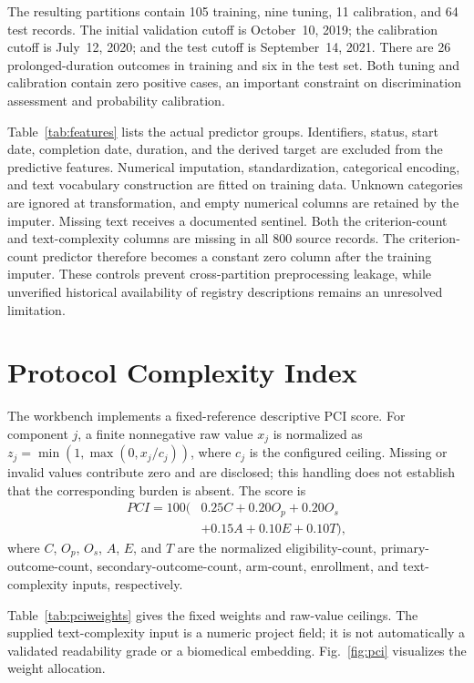 \documentclass[10pt,letterpaper,twocolumn]{article}
\begin{document}
The resulting partitions contain 105 training, nine tuning, 11 calibration, and 64 test records. The initial validation cutoff is October~10, 2019; the calibration cutoff is July~12, 2020; and the test cutoff is September~14, 2021. There are 26 prolonged-duration outcomes in training and six in the test set. Both tuning and calibration contain zero positive cases, an important constraint on discrimination assessment and probability calibration.

Table~\ref{tab:features} lists the actual predictor groups. Identifiers, status, start date, completion date, duration, and the derived target are excluded from the predictive features. Numerical imputation, standardization, categorical encoding, and text vocabulary construction are fitted on training data. Unknown categories are ignored at transformation, and empty numerical columns are retained by the imputer. Missing text receives a documented sentinel. Both the criterion-count and text-complexity columns are missing in all 800 source records. The criterion-count predictor therefore becomes a constant zero column after the training imputer. These controls prevent cross-partition preprocessing leakage, while unverified historical availability of registry descriptions remains an unresolved limitation.

\section{Protocol Complexity Index}

The workbench implements a fixed-reference descriptive PCI score. For component $j$, a finite nonnegative raw value $x_j$ is normalized as $z_j=\min(1,\max(0,x_j/c_j))$, where $c_j$ is the configured ceiling. Missing or invalid values contribute zero and are disclosed; this handling does not establish that the corresponding burden is absent. The score is
\begin{equation}
\begin{split}
PCI=100(&0.25C+0.20O_p+0.20O_s\\
       &+0.15A+0.10E+0.10T),
\end{split}
\label{eq:pci}
\end{equation}
where $C$, $O_p$, $O_s$, $A$, $E$, and $T$ are the normalized eligibility-count, primary-outcome-count, secondary-outcome-count, arm-count, enrollment, and text-complexity inputs, respectively.

Table~\ref{tab:pciweights} gives the fixed weights and raw-value ceilings. The supplied text-complexity input is a numeric project field; it is not automatically a validated readability grade or a biomedical embedding. Fig.~\ref{fig:pci} visualizes the weight allocation.
\end{document}
